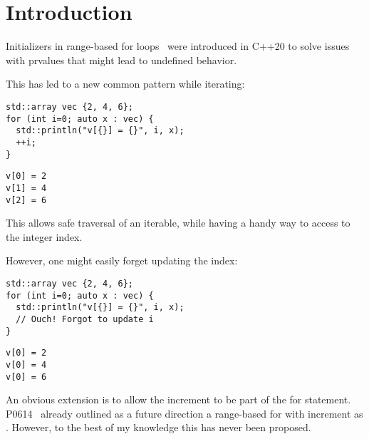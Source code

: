\section{Introduction}

Initializers in range-based for loops~\cite{p0614} were introduced in C++20 to
solve issues with prvalues that might lead to undefined behavior.

This has led to a new common pattern while iterating:

\begin{lstlisting}
std::array vec {2, 4, 6};
for (int i=0; auto x : vec) {
  std::println("v[{}] = {}", i, x);
  ++i;
}
\end{lstlisting}
\begin{lstlisting}[style=terminal]
v[0] = 2
v[1] = 4
v[2] = 6
\end{lstlisting}

This allows safe traversal of an iterable, while having a handy way to access to
the integer index.

However, one might easily forget updating the index:

\begin{lstlisting}
std::array vec {2, 4, 6};
for (int i=0; auto x : vec) {
  std::println("v[{}] = {}", i, x);
  // Ouch! Forgot to update i
}
\end{lstlisting}
\begin{lstlisting}[style=terminal]
v[0] = 2
v[0] = 4
v[0] = 6
\end{lstlisting}

An obvious extension is to allow the increment to be part of the for statement.
P0614~\cite{p0614} already outlined as a future direction a range-based for with
increment as . However, to the best of my
knowledge this has never been proposed.
